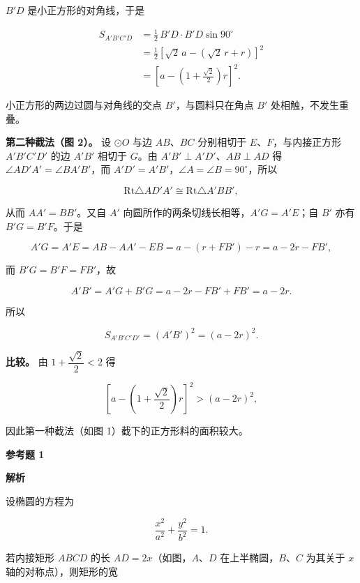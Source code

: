 \begin{answer}
$B'D$ 是小正方形的对角线，于是

\nopagebreak[4]
\[
\begin{aligned}
S_{A'B'C'D}
&=\frac12\,B'D\cdot B'D\sin90^\circ\\
&=\frac12\left[\sqrt2\,a-(\sqrt2\,r+r)\right]^2\\
&=\left[a-\left(1+\frac{\sqrt2}{2}\right)r\right]^2.
\end{aligned}
\]

小正方形的两边过圆与对角线的交点 $B'$，与圆料只在角点 $B'$ 处相触，不发生重叠。

\textbf{第二种截法（图 2）。} 设 $\odot O$ 与边 $AB\text{、}BC$ 分别相切于 $E\text{、}F$，与内接正方形 $A'B'C'D'$ 的边 $A'B'$ 相切于 $G$。由 $A'B'\perp A'D'$、$AB\perp AD$ 得 $\angle AD'A'=\angle BA'B'$，而 $A'D'=A'B'$，$\angle A=\angle B=90^\circ$，所以

\nopagebreak[4]
\[
\mathrm{Rt}\triangle AD'A'\cong\mathrm{Rt}\triangle A'BB',
\]

从而 $AA'=BB'$。又自 $A'$ 向圆所作的两条切线长相等，$A'G=A'E$；自 $B'$ 亦有 $B'G=B'F$。于是

\nopagebreak[4]
\[
A'G=A'E=AB-AA'-EB=a-(r+FB')-r=a-2r-FB',
\]

而 $B'G=B'F=FB'$，故

\nopagebreak[4]
\[
A'B'=A'G+B'G=a-2r-FB'+FB'=a-2r.
\]

所以

\nopagebreak[4]
\[
S_{A'B'C'D'}=(A'B')^2=(a-2r)^2.
\]

\textbf{比较。} 由 $1+\dfrac{\sqrt2}{2}<2$ 得

\nopagebreak[4]
\[
\left[a-\left(1+\frac{\sqrt2}{2}\right)r\right]^2>(a-2r)^2,
\]

因此第一种截法（如图 1）截下的正方形料的面积较大。

\textbf{参考题 1}

\textbf{解析}
\nopagebreak[4]
\begin{center}\end{center}
\nopagebreak[4]
设椭圆的方程为

\nopagebreak[4]
\[
\frac{x^2}{a^2}+\frac{y^2}{b^2}=1.
\]

若内接矩形 $ABCD$ 的长 $AD=2x$（如图，$A\text{、}D$ 在上半椭圆，$B\text{、}C$ 为其关于 $x$ 轴的对称点），则矩形的宽


\end{answer}
